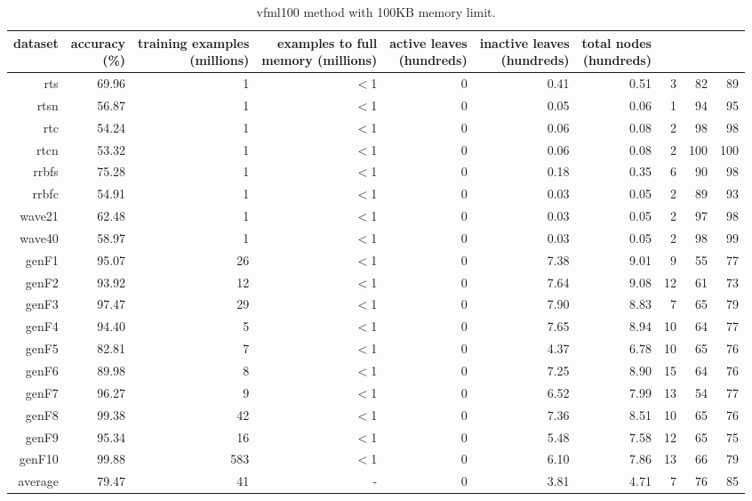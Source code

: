 \clearpage
\begin{table}
\caption{{\sc vfml100} method with 100KB memory limit.}
\label{tab:vfml100-100k}
\centering
\begin{tabular}{|r|r|r|r|r|r|r|r|r|r|}
\hline
dataset	&
\rotatebox{90}{\parbox{9em}{accuracy\\(\%)}} &
\rotatebox{90}{\parbox{9em}{training examples\\(millions)}} &
\rotatebox{90}{\parbox{9em}{examples to full\\memory (millions)}} &
\rotatebox{90}{\parbox{9em}{active leaves\\(hundreds)}} &
\rotatebox{90}{\parbox{9em}{inactive leaves\\(hundreds)}} &
\rotatebox{90}{\parbox{9em}{total nodes\\(hundreds)}} &
\rotatebox{90}{\parbox{9em}{tree depth}}	&
\rotatebox{90}{\parbox{9em}{training speed (\%)}} &
\rotatebox{90}{\parbox{9em}{prediction speed (\%)}} \\
\hline
{\sc rts} & 69.96 & 1 & $<$1 & 0 & 0.41 & 0.51 & 3 & 82 & 89 \\
{\sc rtsn} & 56.87 & 1 & $<$1 & 0 & 0.05 & 0.06 & 1 & 94 & 95 \\
{\sc rtc} & 54.24 & 1 & $<$1 & 0 & 0.06 & 0.08 & 2 & 98 & 98 \\
{\sc rtcn} & 53.32 & 1 & $<$1 & 0 & 0.06 & 0.08 & 2 & 100 & 100 \\
{\sc rrbfs} & 75.28 & 1 & $<$1 & 0 & 0.18 & 0.35 & 6 & 90 & 98 \\
{\sc rrbfc} & 54.91 & 1 & $<$1 & 0 & 0.03 & 0.05 & 2 & 89 & 93 \\
{\sc wave21} & 62.48 & 1 & $<$1 & 0 & 0.03 & 0.05 & 2 & 97 & 98 \\
{\sc wave40} & 58.97 & 1 & $<$1 & 0 & 0.03 & 0.05 & 2 & 98 & 99 \\
{\sc genF1} & 95.07 & 26 & $<$1 & 0 & 7.38 & 9.01 & 9 & 55 & 77 \\
{\sc genF2} & 93.92 & 12 & $<$1 & 0 & 7.64 & 9.08 & 12 & 61 & 73 \\
{\sc genF3} & 97.47 & 29 & $<$1 & 0 & 7.90 & 8.83 & 7 & 65 & 79 \\
{\sc genF4} & 94.40 & 5 & $<$1 & 0 & 7.65 & 8.94 & 10 & 64 & 77 \\
{\sc genF5} & 82.81 & 7 & $<$1 & 0 & 4.37 & 6.78 & 10 & 65 & 76 \\
{\sc genF6} & 89.98 & 8 & $<$1 & 0 & 7.25 & 8.90 & 15 & 64 & 76 \\
{\sc genF7} & 96.27 & 9 & $<$1 & 0 & 6.52 & 7.99 & 13 & 54 & 77 \\
{\sc genF8} & 99.38 & 42 & $<$1 & 0 & 7.36 & 8.51 & 10 & 65 & 76 \\
{\sc genF9} & 95.34 & 16 & $<$1 & 0 & 5.48 & 7.58 & 12 & 65 & 75 \\
{\sc genF10} & 99.88 & 583 & $<$1 & 0 & 6.10 & 7.86 & 13 & 66 & 79 \\
\hline
average & 79.47 & 41 &  -  & 0 & 3.81 & 4.71 & 7 & 76 & 85 \\
\hline
\end{tabular}
\end{table}
